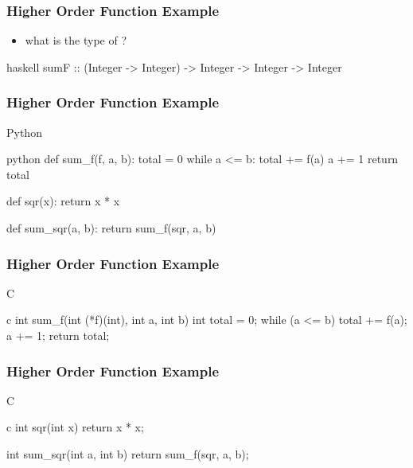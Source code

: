 \documentclass[dvipsnames]{beamer}
\theoremstyle{plain}
\begin{document}
\begin{frame}[fragile]
  \frametitle{Higher Order Function Example}

  \begin{itemize}
    \item what is the type of ?
  \end{itemize}

  \begin{exampleblock}{}
    \begin{pygments}{haskell}
sumF :: (Integer -> Integer) -> Integer -> Integer
        -> Integer
    \end{pygments}
  \end{exampleblock}
\end{frame}

\begin{frame}[fragile]
  \frametitle{Higher Order Function Example}

  \begin{exampleblock}{Python}
    \begin{pygments}{python}
def sum_f(f, a, b):
    total = 0
    while a <= b:
        total += f(a)
        a += 1
    return total

def sqr(x):
    return x * x

def sum_sqr(a, b):
    return sum_f(sqr, a, b)
    \end{pygments}
  \end{exampleblock}
\end{frame}

\begin{frame}[fragile]
  \frametitle{Higher Order Function Example}

  \begin{exampleblock}{C}
    \begin{pygments}{c}
int sum_f(int (*f)(int), int a, int b)
{
    int total = 0;
    while (a <= b) {
        total += f(a);
        a += 1;
    }
    return total;
}
    \end{pygments}
  \end{exampleblock}
\end{frame}

\begin{frame}[fragile]
  \frametitle{Higher Order Function Example}

  \begin{exampleblock}{C}
    \begin{pygments}{c}
int sqr(int x)
{
    return x * x;
}

int sum_sqr(int a, int b)
{
    return sum_f(sqr, a, b);
}
    \end{pygments}
  \end{exampleblock}
\end{frame}
\end{document}
